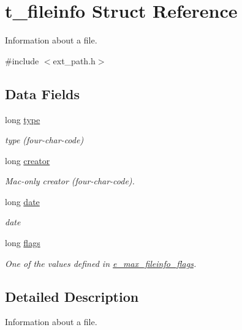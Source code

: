 \hypertarget{structt__fileinfo}{
\section{t\_\-fileinfo Struct Reference}
\label{structt__fileinfo}
}


Information about a file.  


{\ttfamily \#include $<$ext\_\-path.h$>$}\subsection*{Data Fields}
\begin{DoxyCompactItemize}
\item 
\hypertarget{structt__fileinfo_a5ddb40379869f602b0f731bfc4207490}{
long \hyperlink{structt__fileinfo_a5ddb40379869f602b0f731bfc4207490}{type}}
\label{structt__fileinfo_a5ddb40379869f602b0f731bfc4207490}

\begin{DoxyCompactList}\small\item\em type (four-\/char-\/code) \item\end{DoxyCompactList}\item 
\hypertarget{structt__fileinfo_a9e708d199332eda10b48d952a6e6d1c1}{
long \hyperlink{structt__fileinfo_a9e708d199332eda10b48d952a6e6d1c1}{creator}}
\label{structt__fileinfo_a9e708d199332eda10b48d952a6e6d1c1}

\begin{DoxyCompactList}\small\item\em Mac-\/only creator (four-\/char-\/code). \item\end{DoxyCompactList}\item 
\hypertarget{structt__fileinfo_af6dcb03e1d26ffa2707defa719089e3f}{
long \hyperlink{structt__fileinfo_af6dcb03e1d26ffa2707defa719089e3f}{date}}
\label{structt__fileinfo_af6dcb03e1d26ffa2707defa719089e3f}

\begin{DoxyCompactList}\small\item\em date \item\end{DoxyCompactList}\item 
\hypertarget{structt__fileinfo_a81f12a17536c4cea49f41e94454f2a38}{
long \hyperlink{structt__fileinfo_a81f12a17536c4cea49f41e94454f2a38}{flags}}
\label{structt__fileinfo_a81f12a17536c4cea49f41e94454f2a38}

\begin{DoxyCompactList}\small\item\em One of the values defined in \hyperlink{group__files_gaad4b197d6bb36cf68616a756fa85f1be}{e\_\-max\_\-fileinfo\_\-flags}. \item\end{DoxyCompactList}\end{DoxyCompactItemize}


\subsection{Detailed Description}
Information about a file. 